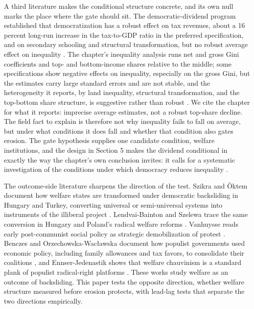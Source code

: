 \documentclass[11pt,letterpaper]{article}
\begin{document}
A third literature makes the conditional structure concrete, and its own null marks the place where the gate should sit. The democratic-dividend program established that democratization has a robust effect on tax revenues, about a 16 percent long-run increase in the tax-to-GDP ratio in the preferred specification, and on secondary schooling and structural transformation, but no robust average effect on inequality \citep{AcemogluNaidu2015}. The chapter's inequality analysis runs net and gross Gini coefficients and top- and bottom-income shares relative to the middle; some specifications show negative effects on inequality, especially on the gross Gini, but the estimates carry large standard errors and are not stable, and the heterogeneity it reports, by land inequality, structural transformation, and the top-bottom share structure, is suggestive rather than robust \citep{AcemogluNaidu2015}. We cite the chapter for what it reports: imprecise average estimates, not a robust top-share decline. The field fact to explain is therefore not why inequality fails to fall on average, but under what conditions it does fall and whether that condition also gates erosion. The gate hypothesis supplies one candidate condition, welfare institutions, and the design in Section 5 makes the dividend conditional in exactly the way the chapter's own conclusion invites: it calls for a systematic investigation of the conditions under which democracy reduces inequality \citep{AcemogluNaidu2015}.

The outcome-side literature sharpens the direction of the test. Szikra and Öktem document how welfare states are transformed under democratic backsliding in Hungary and Turkey, converting universal or semi-universal systems into instruments of the illiberal project \citep{SzikraOktem2023}. Lendvai-Bainton and Szelewa trace the same conversion in Hungary and Poland's radical welfare reforms \citep{LendvaiBainton2021}. Vanhuysse reads early post-communist social policy as strategic demobilization of protest \citep{Vanhuysse2006}. Benczes and Orzechowska-Wacławska document how populist governments used economic policy, including family allowances and tax favors, to consolidate their coalitions \citep{Benczes2024}, and Ennser-Jedenastik shows that welfare chauvinism is a standard plank of populist radical-right platforms \citep{EnnserJedenastik2018}. These works study welfare as an outcome of backsliding. This paper tests the opposite direction, whether welfare structure measured before erosion protects, with lead-lag tests that separate the two directions empirically.
\end{document}
